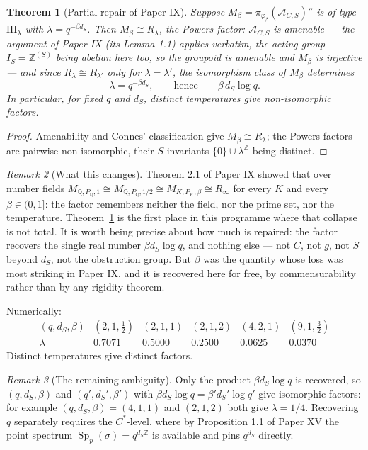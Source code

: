 \documentclass[11pt]{amsart}
\numberwithin{equation}{section}
\newtheorem{theorem}{Theorem}[section]
\theoremstyle{definition}
\theoremstyle{remark}
\newtheorem{remark}[theorem]{Remark}
\newcommand{\Z}{\mathbb{Z}}
\newcommand{\Q}{\mathbb{Q}}
\newcommand{\cA}{\mathcal{A}}
\newcommand{\Sp}{\operatorname{Sp}}
\begin{document}
\begin{theorem}[Partial repair of Paper IX]\label{thm:repair}
Suppose $M_\beta=\pi_{\varphi_\beta}(\cA_{C,S})''$ is of type $\mathrm{III}_\lambda$ with
$\lambda=q^{-\beta d_S}$. Then $M_\beta\cong R_\lambda$, the Powers factor: $\cA_{C,S}$ is
amenable --- the argument of Paper IX (its Lemma 1.1) applies verbatim, the acting group
$I_S=\Z^{(S)}$ being abelian here too, so the groupoid is amenable and $M_\beta$ is
injective --- and since $R_\lambda\cong R_{\lambda'}$ only for
$\lambda=\lambda'$, the isomorphism class of $M_\beta$ determines
\[
\lambda=q^{-\beta d_S},\qquad\text{hence}\qquad \beta\,d_S\log q .
\]
In particular, for fixed $q$ and $d_S$, distinct temperatures give non-isomorphic factors.
\end{theorem}

\begin{proof}
Amenability and Connes' classification give $M_\beta\cong R_\lambda$; the Powers factors are
pairwise non-isomorphic, their $S$-invariants $\{0\}\cup\lambda^\Z$ being distinct.
\end{proof}

\begin{remark}[What this changes]\label{rem:changes}
Theorem 2.1 of Paper IX showed that over number fields
$M_{\Q,P_\Q,1}\cong M_{\Q,P_\Q,1/2}\cong M_{K,P_K,\beta}\cong R_\infty$ for every $K$ and
every $\beta\in(0,1]$: the factor remembers neither the field, nor the prime set, nor the
temperature. Theorem~\ref{thm:repair} is the first place in this programme where that
collapse is not total. It is worth being precise about how much is repaired: the factor
recovers the single real number $\beta d_S\log q$, and nothing else --- not $C$, not $g$, not
$S$ beyond $d_S$, not the obstruction group. But $\beta$ was the quantity whose loss was most
striking in Paper IX, and it is recovered here for free, by commensurability rather
than by any rigidity theorem.

Numerically:
\[
\begin{array}{lccccc}
(q,d_S,\beta) & (2,1,\tfrac12) & (2,1,1) & (2,1,2) & (4,2,1) & (9,1,\tfrac32)\\
\lambda & 0.7071 & 0.5000 & 0.2500 & 0.0625 & 0.0370
\end{array}
\]
Distinct temperatures give distinct factors.
\end{remark}

\begin{remark}[The remaining ambiguity]\label{rem:ambiguity}
Only the product $\beta d_S\log q$ is recovered, so $(q,d_S,\beta)$ and
$(q',d_S',\beta')$ with $\beta d_S\log q=\beta'd_S'\log q'$ give isomorphic factors: for
example $(q,d_S,\beta)=(4,1,1)$ and $(2,1,2)$ both give $\lambda=1/4$. Recovering $q$
separately requires the $C^*$-level, where by Proposition 1.1 of Paper XV the point spectrum
$\Sp_p(\sigma)=q^{d_S\Z}$ is available and pins $q^{d_S}$ directly.
\end{remark}
\end{document}
